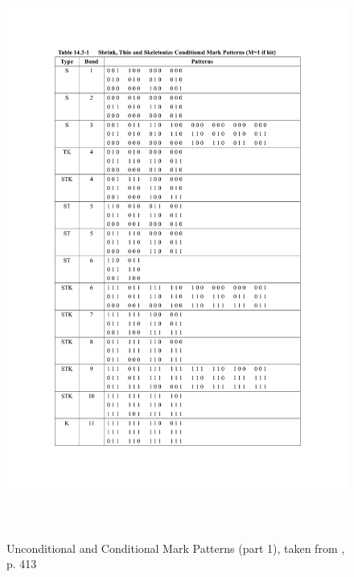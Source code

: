 \documentclass{article}
\begin{document}
\begin{figure}[hb]
 \includegraphics[page=1,height=19cm]{images/patternTables.pdf}
 \caption{Unconditional and Conditional Mark Patterns (part 1), taken from \cite{Pratt:2001:DIP:516234}, p. 413}
 \label{fig:markpatterns1}
\end{figure}
\end{document}
